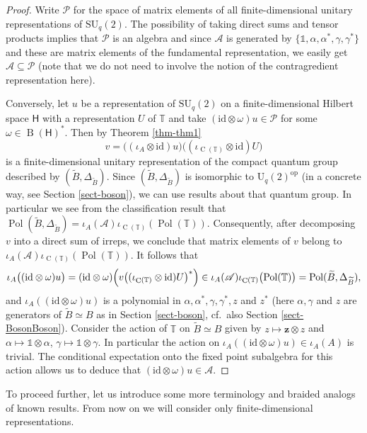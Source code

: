 \documentclass[12pt,reqno,a4paper]{amsart}
\theoremstyle{definition}
\newcommand{\I}{\mathds{1}}
\newcommand{\id}{\mathrm{id}}
\newcommand{\tens}{\otimes}
\newcommand{\TT}{\mathbb{T}}
\newcommand{\cA}{\mathscr{A}}
\newcommand{\sH}{\mathsf{H}}
\newcommand{\bz}{{\boldsymbol{z}}}
\DeclareMathOperator{\B}{B}
\DeclareMathOperator{\C}{C}
\DeclareMathOperator{\Pol}{Pol}
\newcommand{\SU}{\mathrm{SU}}
\numberwithin{equation}{section}
\begin{document}
\begin{proof}
Write $\mathcal{P}$ for the space of matrix elements of all finite-dimensional unitary representations of $\SU_q(2)$. The possibility of taking direct sums and tensor products implies that $\mathcal{P}$ is an algebra
and since $\cA$ is generated by $\{\I,\alpha,\alpha^*,\gamma,\gamma^*\}$ and these are matrix elements of the fundamental representation, we easily get $\cA\subseteq\mathcal{P}$ (note that we do not need to involve the notion of the contragredient representation here).

Conversely, let $u$ be a representation of $\SU_q(2)$ on a finite-dimensional Hilbert space $\sH$ with a representation $U$ of $\TT$ and take $(\id\tens\omega)u\in\mathcal{P}$ for some $\omega\in\B(\sH)^*$. Then by Theorem \ref{thm-thm1}
\[
v=\bigl((\iota_A\tens\id)u\bigr)
\bigl((\iota_{\C(\TT)}\tens\id)U\bigr)
\]
is a finite-dimensional unitary representation of the compact quantum group described by $(\widetilde{B},\Delta_{\widetilde{B}})$. Since $(\widetilde{B},\Delta_{\widetilde{B}})$ is isomorphic to $\mathrm{U}_q(2)^{\text{op}}$ (in a concrete way, see Section \ref{sect-boson}), we can use results about that quantum group. In particular we see from the classification result \cite[Theorem 4.17]{GuinSaurabh} that $\Pol(\widetilde{B},\Delta_{\widetilde{B}})=\iota_A(\cA)\iota_{\C(\TT)}(\Pol(\TT))$. Consequently, after decomposing $v$ into a direct sum of irreps, we conclude that matrix elements of $v$ belong to $\iota_A(\cA)\iota_{\C(\TT)}(\Pol(\TT))$. It follows that
\[
\iota_A\bigl((\id\tens\omega)u\bigr)
=(\id\tens\omega)\Bigl(
v\bigl((\iota_{\C(\TT)}\tens\id)U\bigr)^*\Bigr)
\in\iota_A(\cA)\iota_{\C(\TT)}\bigl(\Pol(\TT)\bigr)=\Pol(\widetilde{B},\Delta_{\widetilde{B}}),
\]
and $\iota_A((\id\tens\omega)u)$ is a polynomial in $\alpha,\alpha^*,\gamma,\gamma^*,z$ and $z^*$ (here $\alpha,\gamma$ and $z$ are generators of $\widetilde{B}\simeq B$ as in Section \ref{sect-boson}, cf.~also Section \ref{sect-BosonBoson}). Consider the action of $\TT$ on $\widetilde{B}\simeq B$ given by $z\mapsto \bz\tens z$ and $\alpha\mapsto\I\tens\alpha$, $\gamma\mapsto\I\tens\gamma$. In particular the action on $\iota_A((\id\tens\omega)u)\in \iota_A(A)$ is trivial. The conditional expectation onto the fixed point subalgebra for this action allows us to deduce that $(\id\tens\omega)u\in\cA$.
\end{proof}

To proceed further, let us introduce some more terminology and braided analogs of known results. From now on we will consider only finite-dimensional representations.
\end{document}

